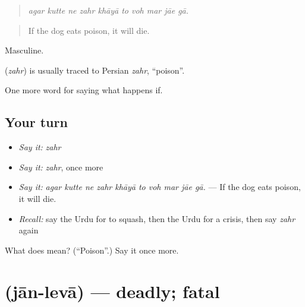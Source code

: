 \begin{quote}
         
\end{quote}

\begin{quote}
\emph{agar kutte ne zahr khāyā to voh mar jāe gā.}
\end{quote}

\begin{quote}
If the dog eats poison, it will die.
\end{quote}

Masculine.

\begin{cousinweb}
\textbf{} (\emph{zahr}) is usually traced to Persian \emph{zahr}, \textquotedblleft{}poison\textquotedblright{}.
\end{cousinweb}

\begin{grammarlens}[title={What you've built}]
One more word for saying what happens if.
\end{grammarlens}

\subsection*{Your turn}
\begin{itemize}
\raggedright
  \item \emph{Say it:} \emph{zahr}
  \item \emph{Say it:} \emph{zahr}, once more
  \item \emph{Say it:} \emph{agar kutte ne zahr khāyā to voh mar jāe gā.} — If the dog eats poison, it will die.
  \item \emph{Recall:} say the Urdu for to squash, then the Urdu for a crisis, then say \emph{zahr} again
\end{itemize}

\begin{tcolorbox}[breakable,colback=teal!4,colframe=teal!35!black,title={Before you move on}]
What does  mean? (\textquotedblleft{}Poison\textquotedblright{}.) Say it once more.
\end{tcolorbox}
\section[\texorpdfstring{\ur{جان} \ur{لیوا} (jān-levā)}{جان لیوا (jān-levā)}]{  (jān-levā) — deadly; fatal}

\label{lesson:UR-C371-jan-leva}



